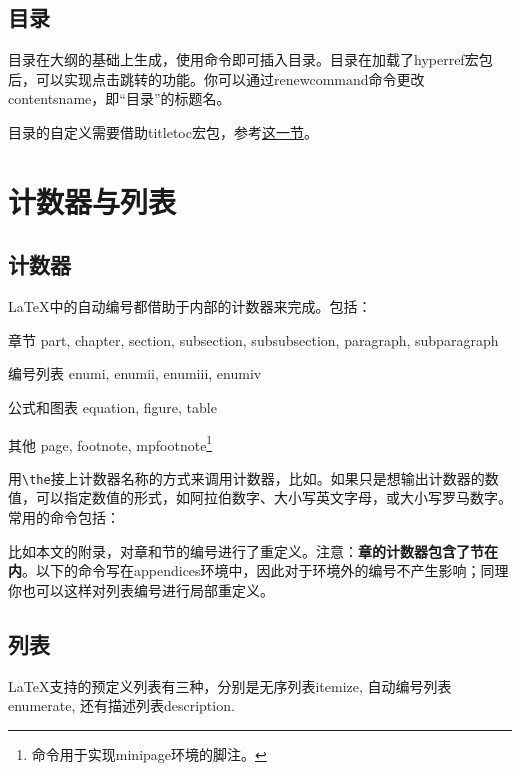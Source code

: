 {\subsection{目录}
目录在大纲的基础上生成，使用命令\latexline{\\tableofcontents}即可插入目录。目录在加载了hyperref宏包后，可以实现点击跳转的功能。你可以通过renewcommand命令更改contentsname，即“目录”的标题名。

目录的自定义需要借助titletoc宏包，参考\hyperref[sec:titletoc]{这一节}。

\section{计数器与列表}

\subsection{计数器}
\LaTeX 中的自动编号都借助于内部的计数器来完成。包括：
\begin{fead}
\item[章节] part, chapter, section, subsection, subsubsection, paragraph, subparagraph
\item[编号列表] enumi, enumii, enumiii, enumiv
\item[公式和图表] equation, figure, table
\item[其他] page, footnote, mpfootnote\footnote{\latexline{\\mpfootnote}命令用于实现minipage环境的脚注。}
\end{fead}

用\verb|\the|接上计数器名称的方式来调用计数器，比如\latexline{\\thechapter}。如果只是想输出计数器的数值，可以指定数值的形式，如阿拉伯数字、大小写英文字母，或大小写罗马数字。常用的命令包括：
\begin{latex}{}
\Alph \alph \Roman \roman
\end{latex}

比如本文的附录，对章和节的编号进行了重定义。注意：\textbf{章的计数器包含了节在内}。以下的命令写在appendices环境中，因此对于环境外的编号不产生影响；同理你也可以这样对列表编号进行局部重定义。
\begin{latex}{}
\renewcommand{\thechapter}{\Alph{chapter}}
\renewcommand{\thesection}
    {\thechapter-\arabic{section}}
\end{latex}

\subsection{列表}
\LaTeX 支持的预定义列表有三种，分别是无序列表itemize, 自动编号列表enumerate, 还有描述列表description. 

}
